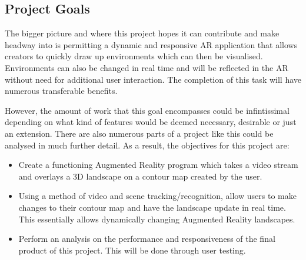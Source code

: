 \documentclass[11pt]{article}
\begin{document}
\subsection{Project Goals}
The bigger picture and where this project hopes it can contribute and make 
headway into is permitting a dynamic and responsive AR application that allows
creators to quickly draw up environments which can then be visualised. 
Environments can also be changed in real time and will be reflected in the AR
without need for additional user interaction. The completion of this
task will have numerous transferable benefits.

However, the amount of work that this goal encompasses could be infintissimal
depending on what kind of features would be deemed necessary, desirable or just an
extension. There are also numerous parts of a project like this could be 
analysed in much further detail. As a result, the objectives for this project
are:

\begin{itemize}
	\item Create a functioning Augmented Reality program which takes a
		  video stream and overlays a 3D landscape on a contour map created by
		  the user.
	\item Using a method of video and scene tracking/recognition, allow users
		  to make changes to their contour map and have the landscape update 
		  in real time. This essentially allows dynamically changing 
		  Augmented Reality landscapes.
	\item Perform an analysis on the performance and responsiveness 
		  of the final product of this project. This will be done
		  through user testing.
\end{itemize}
\end{document}
